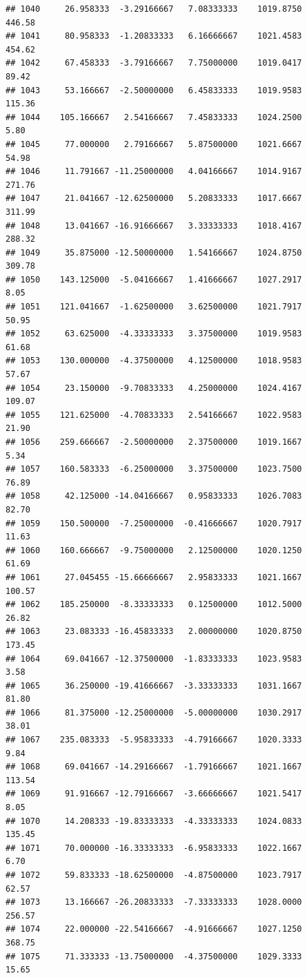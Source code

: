 \documentclass[
]{article}
\begin{document}
\begin{verbatim}
## 1040     26.958333  -3.29166667   7.08333333    1019.8750      446.58
## 1041     80.958333  -1.20833333   6.16666667    1021.4583      454.62
## 1042     67.458333  -3.79166667   7.75000000    1019.0417       89.42
## 1043     53.166667  -2.50000000   6.45833333    1019.9583      115.36
## 1044    105.166667   2.54166667   7.45833333    1024.2500        5.80
## 1045     77.000000   2.79166667   5.87500000    1021.6667       54.98
## 1046     11.791667 -11.25000000   4.04166667    1014.9167      271.76
## 1047     21.041667 -12.62500000   5.20833333    1017.6667      311.99
## 1048     13.041667 -16.91666667   3.33333333    1018.4167      288.32
## 1049     35.875000 -12.50000000   1.54166667    1024.8750      309.78
## 1050    143.125000  -5.04166667   1.41666667    1027.2917        8.05
## 1051    121.041667  -1.62500000   3.62500000    1021.7917       50.95
## 1052     63.625000  -4.33333333   3.37500000    1019.9583       61.68
## 1053    130.000000  -4.37500000   4.12500000    1018.9583       57.67
## 1054     23.150000  -9.70833333   4.25000000    1024.4167      109.07
## 1055    121.625000  -4.70833333   2.54166667    1022.9583       21.90
## 1056    259.666667  -2.50000000   2.37500000    1019.1667        5.34
## 1057    160.583333  -6.25000000   3.37500000    1023.7500       76.89
## 1058     42.125000 -14.04166667   0.95833333    1026.7083       82.70
## 1059    150.500000  -7.25000000  -0.41666667    1020.7917       11.63
## 1060    160.666667  -9.75000000   2.12500000    1020.1250       61.69
## 1061     27.045455 -15.66666667   2.95833333    1021.1667      100.57
## 1062    185.250000  -8.33333333   0.12500000    1012.5000       26.82
## 1063     23.083333 -16.45833333   2.00000000    1020.8750      173.45
## 1064     69.041667 -12.37500000  -1.83333333    1023.9583        3.58
## 1065     36.250000 -19.41666667  -3.33333333    1031.1667       81.80
## 1066     81.375000 -12.25000000  -5.00000000    1030.2917       38.01
## 1067    235.083333  -5.95833333  -4.79166667    1020.3333        9.84
## 1068     69.041667 -14.29166667  -1.79166667    1021.1667      113.54
## 1069     91.916667 -12.79166667  -3.66666667    1021.5417        8.05
## 1070     14.208333 -19.83333333  -4.33333333    1024.0833      135.45
## 1071     70.000000 -16.33333333  -6.95833333    1022.1667        6.70
## 1072     59.833333 -18.62500000  -4.87500000    1023.7917       62.57
## 1073     13.166667 -26.20833333  -7.33333333    1028.0000      256.57
## 1074     22.000000 -22.54166667  -4.91666667    1027.1250      368.75
## 1075     71.333333 -13.75000000  -4.37500000    1029.3333       15.65

\end{verbatim}
\end{document}
